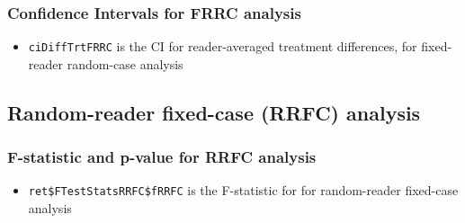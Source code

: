 \documentclass[]{book}
\newenvironment{Shaded}{\begin{snugshade}}{\end{snugshade}}
\newcommand{\CommentTok}[1]{\textcolor[rgb]{0.56,0.35,0.01}{\textit{#1}}}
\newcommand{\NormalTok}[1]{#1}
\newcommand{\OperatorTok}[1]{\textcolor[rgb]{0.81,0.36,0.00}{\textbf{#1}}}
\providecommand{\tightlist}{%
  \setlength{\itemsep}{0pt}\setlength{\parskip}{0pt}}
\begin{document}
\hypertarget{confidence-intervals-for-frrc-analysis-1}{%
\subsubsection{Confidence Intervals for FRRC analysis}\label{confidence-intervals-for-frrc-analysis-1}}

\begin{itemize}
\tightlist
\item
  \texttt{ciDiffTrtFRRC} is the CI for reader-averaged treatment differences, for fixed-reader random-case analysis
\end{itemize}

\begin{Shaded}
\end{Shaded}

\hypertarget{random-reader-fixed-case-rrfc-analysis}{%
\subsection{Random-reader fixed-case (RRFC) analysis}\label{random-reader-fixed-case-rrfc-analysis}}

\hypertarget{f-statistic-and-p-value-for-rrfc-analysis}{%
\subsubsection{F-statistic and p-value for RRFC analysis}\label{f-statistic-and-p-value-for-rrfc-analysis}}

\begin{itemize}
\tightlist
\item
  \texttt{ret\$FTestStatsRRFC\$fRRFC} is the F-statistic for for random-reader fixed-case analysis
\end{itemize}

\begin{Shaded}
\end{Shaded}
\end{document}
